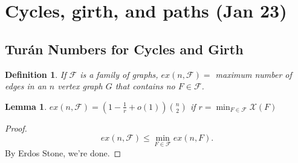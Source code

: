 \documentclass[a4paper]{article}
\newtheorem{lem}[thm]{Lemma}
\newtheorem{defn}[thm]{Definition}
\begin{document}
\section{Cycles, girth, and paths (Jan 23)}

\subsection{Turán Numbers for Cycles and Girth}
\begin{defn}
    If $\mathcal{F}$ is a family of graphs, $ex(n,\mathcal{F})=$ maximum number of edges in an $n$ vertex graph $G$ that contains no $F\in \mathcal{F}$.  
\end{defn}
\begin{lem}
    $ex(n,\mathcal{F})= \left( 1-\frac{1}{r}+o(1) \right){n \choose 2}$ if $r=\min_{{F\in \mathcal{F}}}\mathcal{X}(F)$
\end{lem}
\begin{proof}
        \[
        ex(n,\mathcal{F})\leq \min_{{F\in \mathcal{F}}}ex(n,F)
        .\]
        By Erdos Stone, we're done.
\end{proof}
\end{document}
